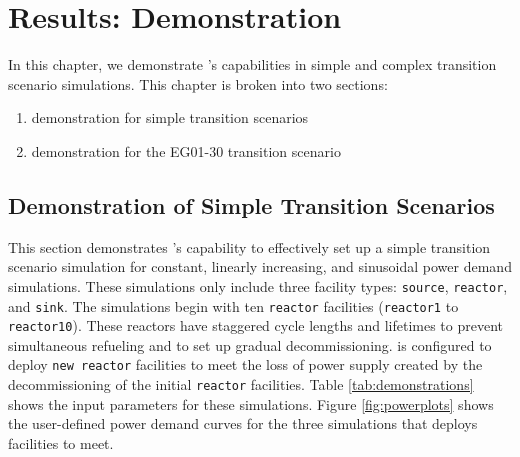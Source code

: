 \chapter{Results: \deploy Demonstration}
In this chapter, we demonstrate \deploy's capabilities
in simple and complex \Cyclus transition scenario simulations.  
This chapter is broken into two sections: 
\begin{enumerate}
    \item \deploy demonstration for simple transition scenarios
    \item \deploy demonstration for the EG01-30 transition scenario
\end{enumerate}

\section{\deploy Demonstration of Simple Transition Scenarios}
\label{sec:demo}

This section demonstrates \deploy's capability 
to effectively set up a simple transition scenario simulation 
for constant, linearly increasing, and 
sinusoidal power demand simulations.
These simulations only include
three facility types: \texttt{source}, \texttt{reactor}, and 
\texttt{sink}. 
The simulations begin with ten \texttt{reactor} facilities 
(\texttt{reactor1} to \texttt{reactor10}). 
These reactors have staggered cycle lengths and lifetimes to prevent 
simultaneous refueling and to set up gradual decommissioning. 
\deploy is configured to deploy \texttt{new reactor} facilities
to meet the loss of power supply created by the decommissioning 
of the initial \texttt{reactor} facilities. 
Table \ref{tab:demonstrations} shows the 
\deploy input parameters for these simulations.
Figure \ref{fig:powerplots} shows the user-defined power demand curves 
for the three simulations that \deploy deploys facilities to meet.

